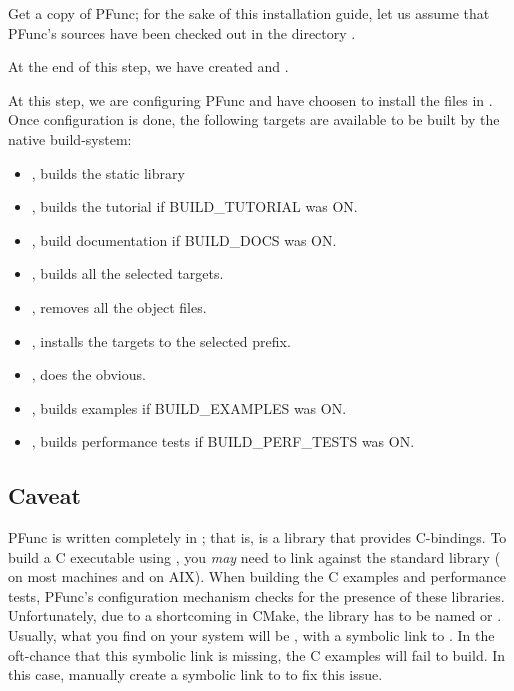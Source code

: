 \begin{list}{}{\leftmargin=0em}
\item
Get a copy of PFunc; for the sake of this installation guide, let us assume
that PFunc's sources have been checked out in the directory
.

\item
{}

At the end of this step, we have created  and 
.

\item
{}

\item
{}

At this step, we are configuring PFunc and have choosen to install the 
files in . 
%
Once configuration is done, the following targets are available to be built by
the native build-system: 
  \begin{itemize}
  \item {}, builds the static library 
  \item {}, builds the tutorial if BUILD\_TUTORIAL was ON.
  \item {}, build documentation if BUILD\_DOCS was ON.
  \item {},  builds all the selected targets.
  \item {}, removes all the object files.
  \item {}, installs the targets to the selected prefix.
  \item {}, does the obvious.
  \item {}, builds examples if BUILD\_EXAMPLES was ON.
  \item {}, builds performance tests if BUILD\_PERF\_TESTS was ON.
  \end{itemize}
\end{list}

%
\subsection{Caveat}
PFunc is written completely in \Cpp{}; that is,  is a \Cpp{}
library that provides C-bindings. 
%
To build a C executable using , you \textit{may}  
need to link against the \Cpp{} standard library ( on most 
machines and  on AIX).
%
When building the C examples and performance tests, PFunc's configuration
mechanism checks for the presence of these libraries. 
%
Unfortunately, due to a shortcoming in CMake, the library has to be named
 or . 
%
Usually, what you find on your system will be , with a
symbolic link to . 
%
In the oft-chance that this symbolic link is missing, the C
examples will fail to build. 
%
In this case, manually create a symbolic link to  to fix this 
issue.
